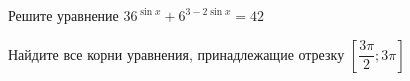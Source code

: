 \begin{ex}
	\begin{condition}
		\begin{enumcols}[label=\asbuk*)]
			\item Решите уравнение \( 36^{\sin x} + 6^{3 - 2\sin x} = 42 \)
			\item Найдите все корни уравнения, принадлежащие отрезку \( \left[\dfrac{3\pi}{2};3\pi\right] \)
		\end{enumcols}
	\end{condition}
\end{ex}